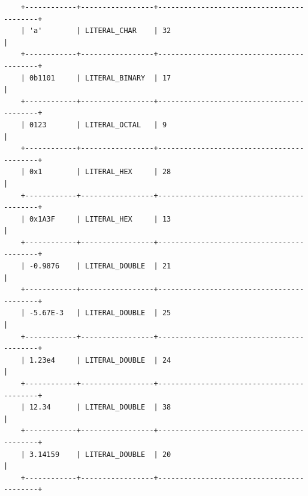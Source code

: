 \documentclass[a4paper,12pt]{article}
\begin{document}
\begin{flushleft}
\begin{verbatim}
	+------------+-----------------+------------------------------------------+
	| 'a'        | LITERAL_CHAR    | 32                                       |
	+------------+-----------------+------------------------------------------+
	| 0b1101     | LITERAL_BINARY  | 17                                       |
	+------------+-----------------+------------------------------------------+
	| 0123       | LITERAL_OCTAL   | 9                                        |
	+------------+-----------------+------------------------------------------+
	| 0x1        | LITERAL_HEX     | 28                                       |
	+------------+-----------------+------------------------------------------+
	| 0x1A3F     | LITERAL_HEX     | 13                                       |
	+------------+-----------------+------------------------------------------+
	| -0.9876    | LITERAL_DOUBLE  | 21                                       |
	+------------+-----------------+------------------------------------------+
	| -5.67E-3   | LITERAL_DOUBLE  | 25                                       |
	+------------+-----------------+------------------------------------------+
	| 1.23e4     | LITERAL_DOUBLE  | 24                                       |
	+------------+-----------------+------------------------------------------+
	| 12.34      | LITERAL_DOUBLE  | 38                                       |
	+------------+-----------------+------------------------------------------+
	| 3.14159    | LITERAL_DOUBLE  | 20                                       |
	+------------+-----------------+------------------------------------------+
	\end{verbatim}
\end{flushleft}
\end{document}
